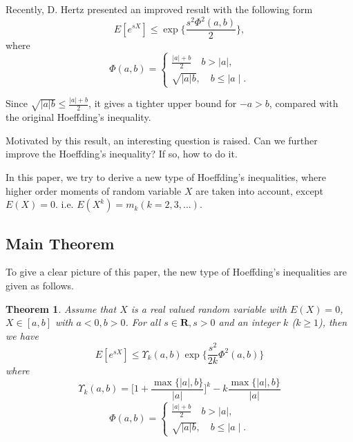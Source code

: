 \documentclass[journal]{IEEEtran}
\newtheorem{thm}{Theorem}%
\begin{document}
Recently, D. Hertz presented an improved result with the following form
\begin{equation} \label{hertz ine}
 E[e^{sX}]\leq  \exp\Big\{\frac{s^2 \Phi^2(a,b)}{2}\Big \},
 \end{equation}
where
\begin{equation}
  \Phi(a,b)=\begin{cases} \frac{|a|+b}{2}\quad b >\mid a\mid, \\
  \sqrt{|a|b},\quad b\leq \mid a\mid.
  \end{cases}
\end{equation}

Since $\sqrt{|a|b} \leq \frac{|a|+b}{2}$, it gives a tighter upper bound for $-a>b$, compared with the original Hoeffding's inequality.

Motivated by this result, an interesting question is raised. Can we further improve the Hoeffding's inequality? If so, how to do it.

In this paper, we try to derive a new type of Hoeffding's inequalities, where higher order moments of random variable $X$ are taken into account, except $E(X)=0$. i.e. $E(X^k)=m_k (k=2,3,...)$.

\subsection{Main Theorem}
To give a clear picture of this paper, the new type of Hoeffding's inequalities are given as follows.

\begin{thm}\label{main theorem}
Assume that $X$ is a real valued random variable with $E(X)=0$, $X\in [a, b]$ with $a<0,b>0$. For all $s\in \textbf{R}, s>0$ and an integer $k$ ($k\geq 1$), then we have
\begin{equation}\label{hoeffding k}
  E[e^{sX}]\leq  \Upsilon_k(a,b) \exp\Big\{\frac{s^2}{2k}\Phi^2(a,b)\Big\}
\end{equation}
where
\begin{equation}
\Upsilon_k(a,b)=\Big[1+\frac{\max\{|a|,b\}}{|a|}\Big]^k-k\frac{\max\{|a|,b\}}{|a|}
\end{equation}
\begin{equation}
  \Phi(a,b)=\begin{cases} \frac{|a|+b}{2}\quad b >\mid a\mid, \\
  \sqrt{|a|b},\quad b\leq \mid a\mid.
  \end{cases}
\end{equation}
\end{thm}
\end{document}
